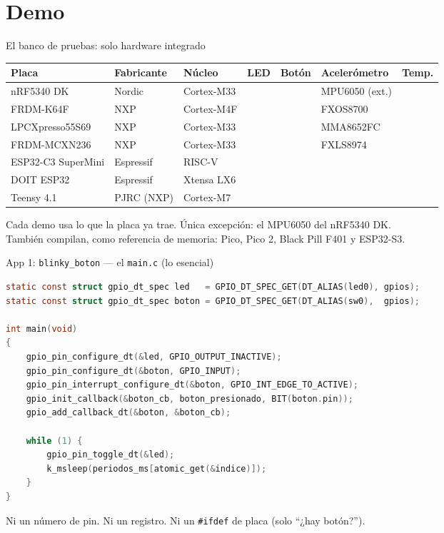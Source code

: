 \documentclass[aspectratio=169]{beamer}
\newcommand{\si}{\textcolor{green!50!black}{\ding{51}}}
\newcommand{\no}{\textcolor{gray!60}{\ding{55}}}
\begin{document}
\section{Demo}

\begin{frame}{El banco de pruebas: solo hardware integrado}
\centering
\footnotesize
\setlength{\tabcolsep}{4pt}\begin{tabular}{lllcclc}
\toprule
\textbf{Placa} & \textbf{Fabricante} & \textbf{Núcleo} & \textbf{LED} & \textbf{Botón} & \textbf{Acelerómetro} & \textbf{Temp.} \\
\midrule
nRF5340 DK & Nordic & Cortex-M33 & \si & \si & MPU6050 (ext.) & \no \\
FRDM-K64F & NXP & Cortex-M4F & \si & \si & FXOS8700 & \si \\
LPCXpresso55S69 & NXP & Cortex-M33 & \si & \si & MMA8652FC & \no \\
FRDM-MCXN236 & NXP & Cortex-M33 & \si & \si & FXLS8974 & \si \\
ESP32-C3 SuperMini & Espressif & \alert{RISC-V} & \si & \si & \no & \si \\
DOIT ESP32 & Espressif & \alert{Xtensa LX6} & \si & \si & \no & \no \\
Teensy 4.1 & PJRC (NXP) & Cortex-M7 & \si & \no & \no & \si \\
\bottomrule
\end{tabular}

\vspace{0.6em}
\footnotesize Cada demo usa lo que la placa ya trae. Única excepción: el MPU6050 del nRF5340 DK.\\
También compilan, como referencia de memoria: Pico, Pico 2, Black Pill F401 y ESP32-S3.
\end{frame}

\begin{frame}[fragile]{App 1: \texttt{blinky\_boton} --- el \texttt{main.c} (lo esencial)}
\begin{lstlisting}[language=C]
static const struct gpio_dt_spec led   = GPIO_DT_SPEC_GET(DT_ALIAS(led0), gpios);
static const struct gpio_dt_spec boton = GPIO_DT_SPEC_GET(DT_ALIAS(sw0),  gpios);

int main(void)
{
    gpio_pin_configure_dt(&led, GPIO_OUTPUT_INACTIVE);
    gpio_pin_configure_dt(&boton, GPIO_INPUT);
    gpio_pin_interrupt_configure_dt(&boton, GPIO_INT_EDGE_TO_ACTIVE);
    gpio_init_callback(&boton_cb, boton_presionado, BIT(boton.pin));
    gpio_add_callback_dt(&boton, &boton_cb);

    while (1) {
        gpio_pin_toggle_dt(&led);
        k_msleep(periodos_ms[atomic_get(&indice)]);
    }
}
\end{lstlisting}
\centering\footnotesize Ni un número de pin. Ni un registro. Ni un \texttt{\#ifdef} de placa (solo ``¿hay botón?'').
\end{frame}
\end{document}

